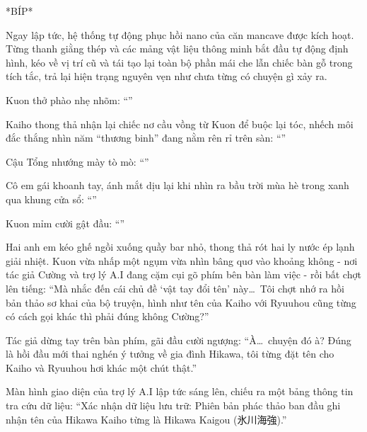 \documentclass[../main.tex]{subfiles}
\begin{document}
*BÍP*

Ngay lập tức, hệ thống tự động phục hồi nano của căn mancave được kích hoạt. Từng thanh giằng thép và các mảng vật liệu thông minh bắt đầu tự động định hình, kéo về vị trí cũ và tái tạo lại toàn bộ phần mái che lẫn chiếc bàn gỗ trong tích tắc, trả lại hiện trạng nguyên vẹn như chưa từng có chuyện gì xảy ra.

Kuon thở phào nhẹ nhõm: ``''

Kaiho thong thả nhận lại chiếc nơ cầu vồng từ Kuon để buộc lại tóc, nhếch môi đắc thắng nhìn năm ``thương binh'' đang nằm rên rỉ trên sàn: ``''

Cậu Tổng nhướng mày tò mò: ``''

Cô em gái khoanh tay, ánh mắt dịu lại khi nhìn ra bầu trời mùa hè trong xanh qua khung cửa sổ: ``''

Kuon mỉm cười gật đầu: ``''

\ct


Hai anh em kéo ghế ngồi xuống quầy bar nhỏ, thong thả rót hai ly nước ép lạnh giải nhiệt. Kuon vừa nhấp một ngụm vừa nhìn bâng quơ vào khoảng không - nơi tác giả Cường và trợ lý A.I đang cặm cụi gõ phím bên bàn làm việc - rồi bất chợt lên tiếng: ``Mà nhắc đến cái chủ đề `vật tay đổi tên' này\dots\ Tôi chợt nhớ ra hồi bản thảo sơ khai của bộ truyện, hình như tên của Kaiho với Ryuuhou cũng từng có cách gọi khác thì phải đúng không Cường?''

Tác giả dừng tay trên bàn phím, gãi đầu cười ngượng: ``À\dots\ chuyện đó à? Đúng là hồi đầu mới thai nghén ý tưởng về gia đình Hikawa, tôi từng đặt tên cho Kaiho và Ryuuhou hơi khác một chút thật.''

Màn hình giao diện của trợ lý A.I lập tức sáng lên, chiếu ra một bảng thông tin tra cứu dữ liệu: ``Xác nhận dữ liệu lưu trữ: Phiên bản phác thảo ban đầu ghi nhận tên của Hikawa Kaiho từng là Hikawa Kaigou (氷川海強).''
\end{document}
